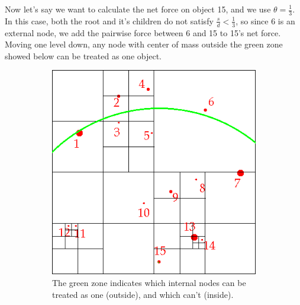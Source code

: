 Now let's say we want to calculate the net force on object 15, and we use $\theta = \frac{1}{3}$. 
In this case, both the root and it's children do not satisfy $\frac{s}{d} < \frac{1}{3}$, so since 6 is an external node, we add the pairwise force between 6 and 15 to 15's net force. 
Moving one level down, any node with center of mass outside the green zone showed below can be treated as one object.
\begin{figure}[ht]
\centering
\begin{subfigure}{0.24\textwidth}
\includegraphics[width=\textwidth]{barneshut_map_green_2.png}
\caption{The green zone indicates which internal nodes can be treated as one (outside), and which can't (inside).}
\end{subfigure}\hspace{1cm}
\begin{subfigure}{0.24\textwidth}

\end{subfigure}
\end{figure}
